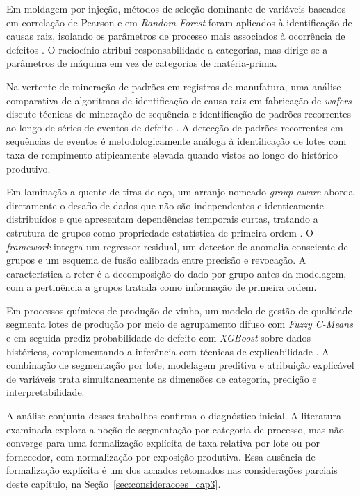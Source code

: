 Em moldagem por injeção, métodos de seleção dominante de variáveis baseados em correlação de Pearson e em \emph{Random Forest} foram aplicados à identificação de causas raiz, isolando os parâmetros de processo mais associados à ocorrência de defeitos \cite{nam2024dominant}. O raciocínio atribui responsabilidade a categorias, mas dirige-se a parâmetros de máquina em vez de categorias de matéria-prima.

Na vertente de mineração de padrões em registros de manufatura, uma análise comparativa de algoritmos de identificação de causa raiz em fabricação de \emph{wafers} discute técnicas de mineração de sequência e identificação de padrões recorrentes ao longo de séries de eventos de defeito \cite{gaurav2025errorrca}. A detecção de padrões recorrentes em sequências de eventos é metodologicamente análoga à identificação de lotes com taxa de rompimento atipicamente elevada quando vistos ao longo do histórico produtivo.

Em laminação a quente de tiras de aço, um arranjo nomeado \emph{group-aware} aborda diretamente o desafio de dados que não são independentes e identicamente distribuídos e que apresentam dependências temporais curtas, tratando a estrutura de grupos como propriedade estatística de primeira ordem \cite{kontogiannis2026groupaware}. O \emph{framework} integra um regressor residual, um detector de anomalia consciente de grupos e um esquema de fusão calibrada entre precisão e revocação. A característica a reter é a decomposição do dado por grupo antes da modelagem, com a pertinência a grupos tratada como informação de primeira ordem.

Em processos químicos de produção de vinho, um modelo de gestão de qualidade segmenta lotes de produção por meio de agrupamento difuso com \emph{Fuzzy C-Means} e em seguida prediz probabilidade de defeito com \emph{XGBoost} sobre dados históricos, complementando a inferência com técnicas de explicabilidade \cite{marindiaz2025fuzzy}. A combinação de segmentação por lote, modelagem preditiva e atribuição explicável de variáveis trata simultaneamente as dimensões de categoria, predição e interpretabilidade.

A análise conjunta desses trabalhos confirma o diagnóstico inicial. A literatura examinada explora a noção de segmentação por categoria de processo, mas não converge para uma formalização explícita de taxa relativa por lote ou por fornecedor, com normalização por exposição produtiva. Essa ausência de formalização explícita é um dos achados retomados nas considerações parciais deste capítulo, na Seção~\ref{sec:consideracoes_cap3}.


